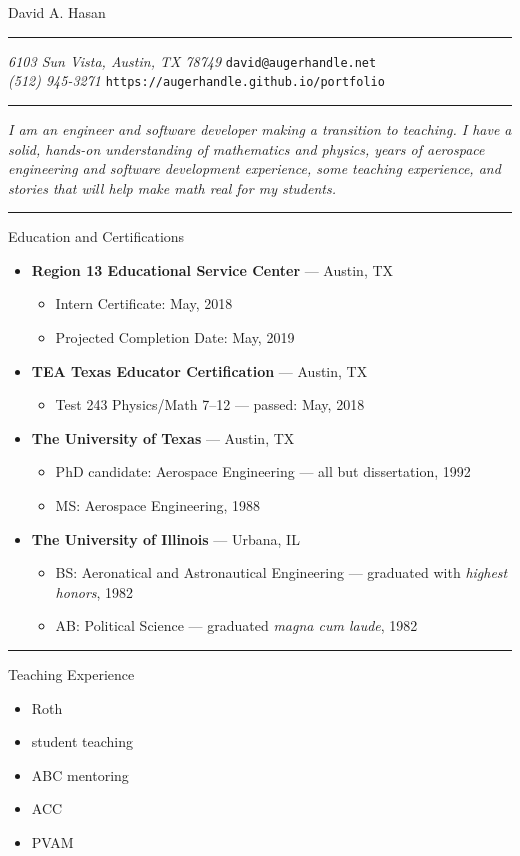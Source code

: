 \documentclass[11pt,oneside]{article}
\makeatletter
\newcommand{\name}{David A. Hasan}
\newcommand{\addr}{6103 Sun Vista, Austin, TX 78749}
\newcommand{\phone}{(512) 945-3271}
\newcommand{\email}{david@augerhandle.net}
\newcommand{\web}{https://augerhandle.github.io/portfolio}
\newcommand{\resheader}{
	\begin{center}
		\Huge\name
	\end{center}
	\vspace{-8pt} \rule{\textwidth}{1pt}
	\vspace{-8pt}
	{\small \textit{\addr} \hfill \texttt{\email}}\\
	{\vskip -6pt}{\small \textit{\phone} \hfill \texttt{\web}}
	{\vskip -6pt}\rule{\textwidth}{1pt}
}
\newcommand{\resabstract}[1]{
	\begin{changemargin}{.45in}{.45in}
		\textit{#1}
	\end{changemargin}
}
\newenvironment{ressection}[1]{
	\rule{\textwidth}{0.25pt}	\vspace{4pt}
	{\fontfamily{phv}\selectfont\Large#1}
	\begin{itemize}
	\vspace{3pt}
}{
	\end{itemize}
}
\newcommand{\resitem}[1]{
	\vspace{-4pt}
	\item \begin{flushleft} #1 \end{flushleft}
}
\newcommand{\ressubitem}[1]{
	\vspace{-1pt}
	\item \begin{flushleft} #1 \end{flushleft}
}
\newenvironment{reslistx}[2]{
	\resitem{\textbf{#1} --- #2}
	\vspace{-5pt}
	\begin{itemize}
}{
	\end{itemize}
}
\makeatother
\begin{document}
 \selectfont

\resheader

\resabstract{%
	I am an engineer and software developer making
	a transition to teaching.
	I have a solid, hands-on understanding of mathematics
	and physics, years of aerospace engineering and software development experience,
	some teaching experience,
	and stories that will help make math real for my students.
}

\begin{ressection}{Education and Certifications}

	\begin{reslistx}{Region 13 Educational Service Center}{Austin, TX}
		\ressubitem{Intern Certificate: May, 2018}
		\ressubitem{Projected Completion Date: May, 2019}
	\end{reslistx}

	\begin{reslistx}{TEA Texas Educator Certification}{Austin, TX}
		\ressubitem{Test 243 Physics/Math 7--12 --- passed: May, 2018}
	\end{reslistx}

	\begin{reslistx}{The University of Texas}{Austin, TX}
		\ressubitem{PhD candidate: Aerospace Engineering --- all but dissertation, 1992}
		\ressubitem{MS: Aerospace Engineering, 1988}
	\end{reslistx}

	\begin{reslistx}{The University of Illinois}{Urbana, IL}
		\ressubitem{BS: Aeronatical and Astronautical Engineering --- graduated with \textit{highest honors}, 1982}
		\ressubitem{AB: Political Science --- graduated \textit{magna cum laude}, 1982}
	\end{reslistx}

\end{ressection}

\begin{ressection}{Teaching Experience}
	\ressubitem{Roth}
	\ressubitem{student teaching}
	\ressubitem{ABC mentoring}
	\ressubitem{ACC}
	\ressubitem{PVAM}
\end{ressection}
\end{document}
